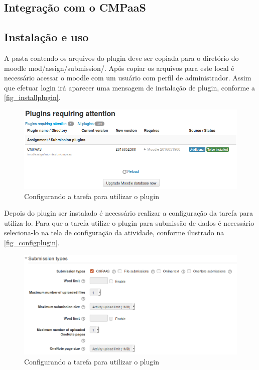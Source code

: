 \documentclass[
	12pt,				%
	openright,			%
	oneside,			%
	a4paper,			%
	english,			%
	french,				%
	spanish,			%
	brazil				%
	]{abntex2}
\begin{document}
\subsection{Integração com o CMPaaS}

\subsection{Instalação e uso}
A pasta contendo os arquivos do plugin deve ser copiada para o diretório do moodle mod/assign/submission/. Após copiar os arquivos para este local é necessário acessar o moodle com um usuário com perfil de administrador. Assim que efetuar login irá aparecer uma mensagem de instalação de plugin, conforme a \autoref{fig_installplugin}.
\begin{figure}[htb]
	\caption{\label{fig_installplugin} Configurando a tarefa para utilizar o plugin}
	\begin{center}
		\includegraphics[scale=0.4]{installplugin.png}
	\end{center}
\end{figure}

Depois do plugin ser instalado é necessário realizar a configuração da tarefa para utiliza-lo. Para que a tarefa utilize o plugin para submissão de dados é necessário seleciona-lo na tela de configuração da atividade, conforme ilustrado na \autoref{fig_configplugin}.

\begin{figure}[htb]
	\caption{\label{fig_configplugin} Configurando a tarefa para utilizar o plugin}
	\begin{center}
		\includegraphics[scale=0.4]{configplugin.png}
	\end{center}
\end{figure}
\end{document}
